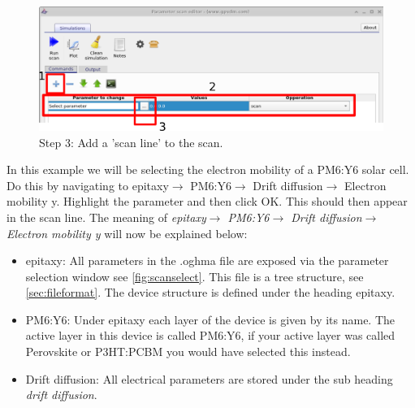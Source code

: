 \begin{figure}[H]
\centering
\includegraphics[width=\textwidth]{./images/param_scan_new_line.png}
\caption{Step 3: Add a 'scan line' to the scan.}
\label{fig:newscanline}
\end{figure}
\pagebreak
\noindent
\begin{minipage}{0.5\textwidth}

In this example we will be selecting the electron mobility of a PM6:Y6 solar cell. Do this by navigating to epitaxy$\rightarrow$ PM6:Y6$\rightarrow$ Drift diffusion$\rightarrow$ Electron mobility y. Highlight the parameter and then click OK. This should then appear in the scan line. The meaning of \emph{epitaxy$\rightarrow$ PM6:Y6$\rightarrow$ Drift diffusion$\rightarrow$Electron mobility y} will now be explained below:

\begin{itemize}
  \item epitaxy: All parameters in the .oghma file are exposed via the parameter selection window see \ref{fig:scanselect}. This file is a tree structure, see \ref{sec:fileformat}. The device structure is defined under the heading epitaxy.
  \item PM6:Y6: Under epitaxy each layer of the device is given by its name. The active layer in this device is called PM6:Y6, if your active layer was called Perovskite or P3HT:PCBM you would have selected this instead.
  \item Drift diffusion: All electrical parameters are stored under the sub heading \emph{drift diffusion}.
\end{itemize}

\end{minipage}%
\hspace{4pt}
